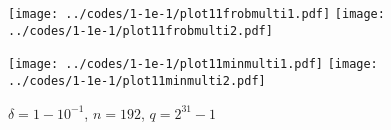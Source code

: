 \documentclass{article}
\begin{document}
\begin{figure}
\begin{centering}
{\texttt{[image: ../codes/1-1e-1/plot11frobmulti1.pdf]}}
{\texttt{[image: ../codes/1-1e-1/plot11frobmulti2.pdf]}}

{\texttt{[image: ../codes/1-1e-1/plot11minmulti1.pdf]}}
{\texttt{[image: ../codes/1-1e-1/plot11minmulti2.pdf]}}

\end{centering}
\caption{$\delta = 1-10^{-1}$, $n = 192$, $q = 2^{31} - 1$}
\label{pserr1-1e-1-31}
\end{figure}



\clearpage





\end{document}
